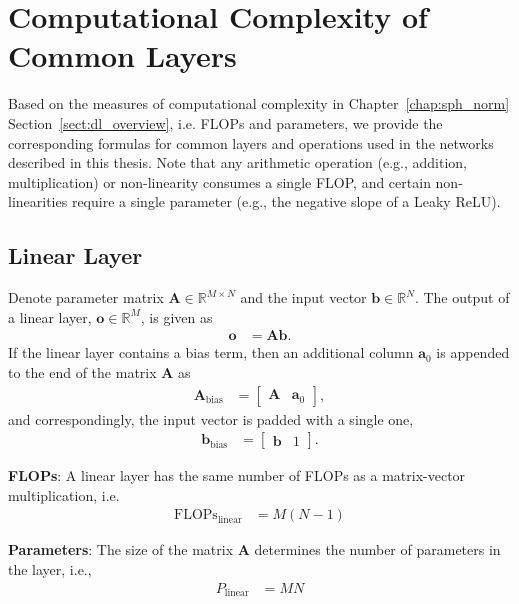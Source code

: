 \chapter{Computational Complexity of Common Layers}
\label{appdx:complexity}
Based on the measures of computational complexity in Chapter~\ref{chap:sph_norm} Section~\ref{sect:dl_overview}, i.e. FLOPs and parameters, we provide the corresponding formulas for common layers and operations used in the networks described in this thesis. Note that any arithmetic operation (e.g., addition, multiplication) or non-linearity consumes a single FLOP, and certain non-linearities require a single parameter (e.g., the negative slope of a Leaky ReLU).

\section{Linear Layer}
Denote parameter matrix $\mathbf{A}\in\mathbb{R}^{M\times N}$ and the input vector $\mathbf{b}\in\mathbb{R}^{N}$. The output of a linear layer, $\mathbf{o}\in\mathbb{R}^M$, is given as
\begin{align*}
	\mathbf{o} &= \mathbf{A}\mathbf{b}.
\end{align*}
If the linear layer contains a bias term, then an additional column $\mathbf{a}_0$ is appended to the end of the matrix $\mathbf{A}$ as
\begin{align*}
	\mathbf{A}_{\text{bias}} &= \begin{bmatrix}\mathbf{A} & \mathbf{a}_0\end{bmatrix},
\end{align*}
and correspondingly, the input vector is padded with a single one,
\begin{align*}
	\mathbf{b}_{\text{bias}} &= \begin{bmatrix}\mathbf{b} & 1\end{bmatrix}.
\end{align*}

\textbf{FLOPs}: A linear layer has the same number of FLOPs as a matrix-vector multiplication, i.e.
\begin{align*}
	\text{FLOPs}_{\text{linear}} &= M(N-1)
\end{align*}

\textbf{Parameters}: The size of the matrix $\mathbf{A}$ determines the number of parameters in the layer, i.e.,
\begin{align*}
	P_{\text{linear}} &= MN
\end{align*}

